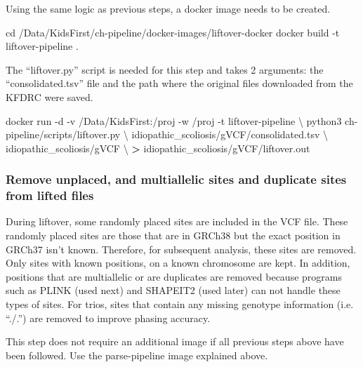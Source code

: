 \documentclass[]{article}
\newenvironment{Shaded}{\begin{snugshade}}{\end{snugshade}}
\newcommand{\BuiltInTok}[1]{#1}
\newcommand{\ExtensionTok}[1]{#1}
\newcommand{\NormalTok}[1]{#1}
\newcommand{\OperatorTok}[1]{\textcolor[rgb]{0.81,0.36,0.00}{\textbf{#1}}}
\begin{document}
Using the same logic as previous steps, a docker image needs to be
created.

\begin{Shaded}
\begin{Highlighting}[]
\BuiltInTok{cd}\NormalTok{ /Data/KidsFirst/ch-pipeline/docker-images/liftover-docker}
\ExtensionTok{docker}\NormalTok{ build -t liftover-pipeline .}
\end{Highlighting}
\end{Shaded}

The ``liftover.py'' script is needed for this step and takes 2
arguments: the ``consolidated.tsv'' file and the path where the original
files downloaded from the KFDRC were saved.

\begin{Shaded}
\begin{Highlighting}[]
\ExtensionTok{docker}\NormalTok{ run -d -v /Data/KidsFirst:/proj -w /proj -t liftover-pipeline \textbackslash{}}
\NormalTok{  python3 ch-pipeline/scripts/liftover.py \textbackslash{}}
\NormalTok{  idiopathic_scoliosis/gVCF/consolidated.tsv \textbackslash{}}
\NormalTok{  idiopathic_scoliosis/gVCF \textbackslash{}}
  \OperatorTok{>}\NormalTok{ idiopathic_scoliosis/gVCF/liftover.out}
\end{Highlighting}
\end{Shaded}

\hypertarget{remove-unplaced-and-multiallelic-sites-and-duplicate-sites-from-lifted-files}{%
\subsubsection{Remove unplaced, and multiallelic sites and duplicate
sites from lifted
files}\label{remove-unplaced-and-multiallelic-sites-and-duplicate-sites-from-lifted-files}}

During liftover, some randomly placed sites are included in the VCF
file. These randomly placed sites are those that are in GRCh38 but the
exact position in GRCh37 isn't known. Therefore, for subsequent
analysis, these sites are removed. Only sites with known positions, on a
known chromosome are kept. In addition, positions that are multiallelic
or are duplicates are removed because programs such as PLINK (used next)
and SHAPEIT2 (used later) can not handle these types of sites. For
trios, sites that contain any missing genotype information (i.e.
``./.'') are removed to improve phasing accuracy.

This step does not require an additional image if all previous steps
above have been followed. Use the parse-pipeline image explained above.
\end{document}
